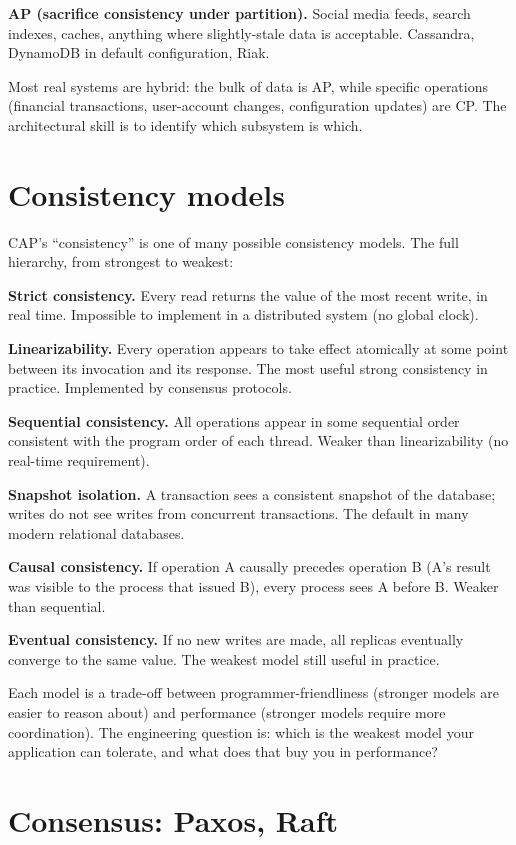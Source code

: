 \textbf{AP (sacrifice consistency under partition).} Social media feeds, search indexes, caches, anything where slightly-stale data is acceptable. Cassandra, DynamoDB in default configuration, Riak.

Most real systems are hybrid: the bulk of data is AP, while specific operations (financial transactions, user-account changes, configuration updates) are CP. The architectural skill is to identify which subsystem is which.

\section{Consistency models}

CAP's ``consistency'' is one of many possible consistency models. The full hierarchy, from strongest to weakest:

\textbf{Strict consistency.} Every read returns the value of the most recent write, in real time. Impossible to implement in a distributed system (no global clock).

\textbf{Linearizability.} Every operation appears to take effect atomically at some point between its invocation and its response. The most useful strong consistency in practice. Implemented by consensus protocols.

\textbf{Sequential consistency.} All operations appear in some sequential order consistent with the program order of each thread. Weaker than linearizability (no real-time requirement).

\textbf{Snapshot isolation.} A transaction sees a consistent snapshot of the database; writes do not see writes from concurrent transactions. The default in many modern relational databases.

\textbf{Causal consistency.} If operation A causally precedes operation B (A's result was visible to the process that issued B), every process sees A before B. Weaker than sequential.

\textbf{Eventual consistency.} If no new writes are made, all replicas eventually converge to the same value. The weakest model still useful in practice.

Each model is a trade-off between programmer-friendliness (stronger models are easier to reason about) and performance (stronger models require more coordination). The engineering question is: which is the weakest model your application can tolerate, and what does that buy you in performance?

\section{Consensus: Paxos, Raft}

